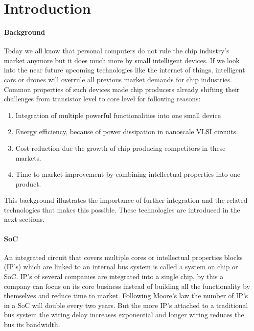 \section{Introduction}

\paragraph{Background}

Today we all know that personal computers do not rule the chip industry's market
anymore but it does much more by small intelligent devices. If we look into the
near future upcoming technologies like the internet of things, intelligent cars
or drones will overrule all previous market demands for chip industries. Common
properties of such devices made chip producers already shifting their challenges
from transistor level to core level for following reasons:

\begin{enumerate}
\item Integration of multiple powerful functionalities into one small device
\item Energy efficiency, because of power dissipation in nanoscale VLSI circuits. 
\item Cost reduction due the growth of chip producing competitors in these markets.
\item Time to market improvement by combining intellectual properties into one product.
\end{enumerate}

This background illustrates the importance of further integration and the
related technologies that makes this possible. These technologies are introduced
in the next sections. \cite{SoC-market}

\paragraph{SoC}

An integrated circuit that covers multiple cores or intellectual properties
blocks (IP's) which are linked to an internal bus system is called a system on
chip or SoC. IP's of several companies are integrated into a single chip, by
this a company can focus on its core business instead of building all the
functionality by themselves and reduce time to market. Following Moore's law the
number of IP's in a SoC will double every two years. But the more IP's attached
to a traditional bus system the wiring delay increases exponential and longer
wiring reduces the bus its bandwidth.\cite{SoC}

